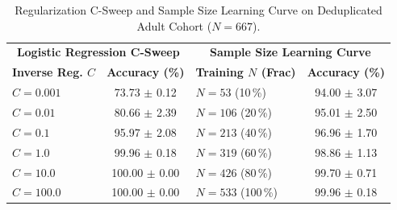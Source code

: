 \begin{table}[h]
\centering
\caption{Regularization C-Sweep and Sample Size Learning Curve on Deduplicated Adult Cohort ($N = 667$).}
\label{tab:csweep_learning_curve}
\footnotesize
\setlength{\tabcolsep}{4.5pt}
\begin{tabular}{lc|lc}
\toprule
\multicolumn{2}{c|}{\textbf{Logistic Regression C-Sweep}} & \multicolumn{2}{c}{\textbf{Sample Size Learning Curve}} \\
\textbf{Inverse Reg. $C$} & \textbf{Accuracy (\%)} & \textbf{Training $N$ (Frac)} & \textbf{Accuracy (\%)} \\
\midrule
$C = 0.001$ & 73.73 $\pm$ 0.12 & $N = 53$ (10\,\%) & 94.00 $\pm$ 3.07 \\
$C = 0.01$ & 80.66 $\pm$ 2.39 & $N = 106$ (20\,\%) & 95.01 $\pm$ 2.50 \\
$C = 0.1$ & 95.97 $\pm$ 2.08 & $N = 213$ (40\,\%) & 96.96 $\pm$ 1.70 \\
$C = 1.0$ & 99.96 $\pm$ 0.18 & $N = 319$ (60\,\%) & 98.86 $\pm$ 1.13 \\
$C = 10.0$ & 100.00 $\pm$ 0.00 & $N = 426$ (80\,\%) & 99.70 $\pm$ 0.71 \\
$C = 100.0$ & 100.00 $\pm$ 0.00 & $N = 533$ (100\,\%) & 99.96 $\pm$ 0.18 \\
\bottomrule
\end{tabular}
\end{table}
